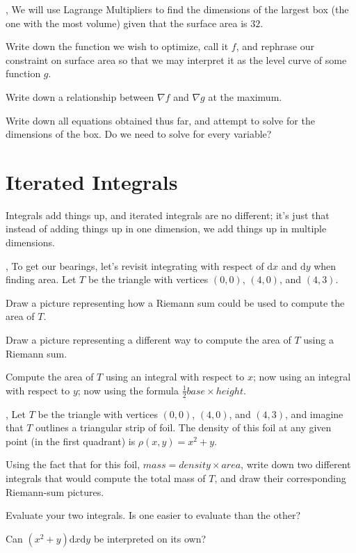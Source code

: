 \documentclass[letter]{article}
\begin{document}
	\sep
	We will use Lagrange Multipliers to find the dimensions of the largest box (the one with the most volume)
	given that the surface area is $32$.
	\begin{Enum}
		\item Write down the function we wish to optimize, call it $f$, and rephrase our constraint
			on surface area so that we may interpret it as the level curve of some function $g$.
		\item Write down a relationship between $\nabla f$ and $\nabla g$ at the maximum.
		\item Write down all equations obtained thus far, and attempt to solve for the dimensions of the box.
			Do we need to solve for every variable?
	\end{Enum}
\newpage

\section*{Iterated Integrals}
	Integrals add things up, and iterated integrals are no different; it's just that instead of adding things
	up in one dimension, we add things up in multiple dimensions.

	\sep
	To get our bearings, let's revisit integrating with respect of $\mathrm{d}x$ and $\mathrm{d}y$
	when finding area.  Let $T$ be the triangle with vertices $(0,0)$, $(4,0)$, and $(4,3)$.
	\begin{Enum}
		\item Draw a picture representing how a Riemann sum could be used to compute the area of $T$.
		\item Draw a picture representing a different way to compute the area of $T$ using a Riemann sum.
		\item Compute the area of $T$ using an integral with respect to $x$; now using an integral with 
			respect to $y$; now using the formula $\frac{1}{2}base\times height$.
	\end{Enum}

	\sep
	Let $T$ be the triangle with vertices $(0,0)$, $(4,0)$, and $(4,3)$, and imagine that $T$
	outlines a triangular strip of foil.  The density of this foil at any given point (in the 
	first quadrant) is
	$\rho(x,y) = x^2+y$.
	\begin{Enum}
		\item Using the fact that for this foil, $mass=density\times area$, write down two different
			integrals that would compute the total mass of $T$, and draw their corresponding
			Riemann-sum pictures.
		\item Evaluate your two integrals.  Is one easier to evaluate than the other?
		\item Can $(x^2+y)\mathrm{d}x\mathrm{d}y$ be interpreted on its own?
	\end{Enum}
\end{document}
